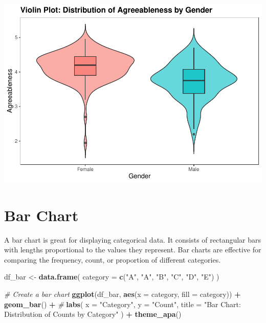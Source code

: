 \documentclass[
]{book}
\newenvironment{Shaded}{\begin{snugshade}}{\end{snugshade}}
\newcommand{\AttributeTok}[1]{\textcolor[rgb]{0.13,0.29,0.53}{#1}}
\newcommand{\CommentTok}[1]{\textcolor[rgb]{0.56,0.35,0.01}{\textit{#1}}}
\newcommand{\FunctionTok}[1]{\textcolor[rgb]{0.13,0.29,0.53}{\textbf{#1}}}
\newcommand{\NormalTok}[1]{#1}
\newcommand{\OtherTok}[1]{\textcolor[rgb]{0.56,0.35,0.01}{#1}}
\newcommand{\SpecialCharTok}[1]{\textcolor[rgb]{0.81,0.36,0.00}{\textbf{#1}}}
\newcommand{\StringTok}[1]{\textcolor[rgb]{0.31,0.60,0.02}{#1}}
\begin{document}
\includegraphics{rintro_demo_files/figure-latex/unnamed-chunk-322-1.pdf}

\hypertarget{bar-chart}{%
\section{Bar Chart}\label{bar-chart}}

A bar chart is great for displaying categorical data. It consists of rectangular bars with lengths proportional to the values they represent. Bar charts are effective for comparing the frequency, count, or proportion of different categories.

\begin{Shaded}
\begin{Highlighting}[]
\NormalTok{df\_bar }\OtherTok{\textless{}{-}} \FunctionTok{data.frame}\NormalTok{(}
  \AttributeTok{category =} \FunctionTok{c}\NormalTok{(}\StringTok{"A"}\NormalTok{, }\StringTok{"A"}\NormalTok{, }\StringTok{"B"}\NormalTok{, }\StringTok{"C"}\NormalTok{, }\StringTok{"D"}\NormalTok{, }\StringTok{"E"}\NormalTok{)}
\NormalTok{)}

\CommentTok{\# Create a bar chart}
\FunctionTok{ggplot}\NormalTok{(df\_bar, }\FunctionTok{aes}\NormalTok{(}\AttributeTok{x =}\NormalTok{ category, }\AttributeTok{fill =}\NormalTok{ category)) }\SpecialCharTok{+}
  \FunctionTok{geom\_bar}\NormalTok{() }\SpecialCharTok{+} \CommentTok{\#}
  \FunctionTok{labs}\NormalTok{(}
    \AttributeTok{x =} \StringTok{"Category"}\NormalTok{,}
    \AttributeTok{y =} \StringTok{"Count"}\NormalTok{,}
    \AttributeTok{title =} \StringTok{"Bar Chart: Distribution of Counts by Category"}
\NormalTok{  ) }\SpecialCharTok{+}
  \FunctionTok{theme\_apa}\NormalTok{()}
\end{Highlighting}
\end{Shaded}
\end{document}
